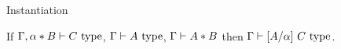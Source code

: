 %
%
%
%
%

\begin{lemma}{Instantiation} \label{instantiation}

  If $\Gamma, \alpha * B \vdash C \ \text{type}$, $\Gamma \vdash A \ \text{type}$, $\Gamma \vdash A * B$ then $\Gamma \vdash \lbrack A / \alpha \rbrack~ C \ \text{type}$.

\end{lemma}

